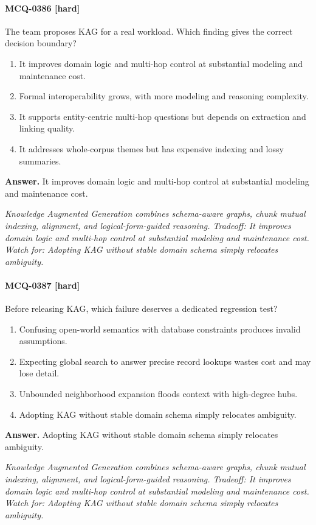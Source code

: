 \paragraph{MCQ-0386 [hard]} The team proposes KAG for a real workload. Which finding gives the correct decision boundary?
\begin{enumerate}[label=\Alph*.]
\item It improves domain logic and multi-hop control at substantial modeling and maintenance cost.
\item Formal interoperability grows, with more modeling and reasoning complexity.
\item It supports entity-centric multi-hop questions but depends on extraction and linking quality.
\item It addresses whole-corpus themes but has expensive indexing and lossy summaries.
\end{enumerate}
\noindent\textbf{Answer.} It improves domain logic and multi-hop control at substantial modeling and maintenance cost.
\par\textit{Knowledge Augmented Generation combines schema-aware graphs, chunk mutual indexing, alignment, and logical-form-guided reasoning. Tradeoff: It improves domain logic and multi-hop control at substantial modeling and maintenance cost. Watch for: Adopting KAG without stable domain schema simply relocates ambiguity.}
\paragraph{MCQ-0387 [hard]} Before releasing KAG, which failure deserves a dedicated regression test?
\begin{enumerate}[label=\Alph*.]
\item Confusing open-world semantics with database constraints produces invalid assumptions.
\item Expecting global search to answer precise record lookups wastes cost and may lose detail.
\item Unbounded neighborhood expansion floods context with high-degree hubs.
\item Adopting KAG without stable domain schema simply relocates ambiguity.
\end{enumerate}
\noindent\textbf{Answer.} Adopting KAG without stable domain schema simply relocates ambiguity.
\par\textit{Knowledge Augmented Generation combines schema-aware graphs, chunk mutual indexing, alignment, and logical-form-guided reasoning. Tradeoff: It improves domain logic and multi-hop control at substantial modeling and maintenance cost. Watch for: Adopting KAG without stable domain schema simply relocates ambiguity.}
